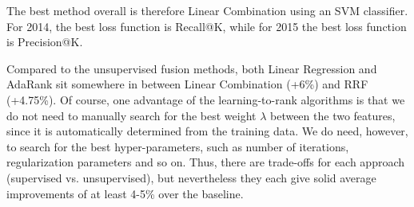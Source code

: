 \begin{table}[h!]
\centering
\caption{Comparison between the best fusion methods --- absolute P@10 percent improvements for each of the four query runs
(Summaries 2014, Descriptions 2014, Summaries 2015, Descriptions 2015).}
\label{fusion-comp}
\end{table}

The best method overall is therefore Linear Combination using an SVM classifier. For 2014, the best loss function
is Recall@K, while for 2015 the best loss function is Precision@K.

Compared to the unsupervised fusion methods, both Linear Regression and AdaRank sit somewhere in between
Linear Combination (+6\%) and RRF (+4.75\%). Of course, one advantage of the learning-to-rank algorithms
is that we do not need to manually search for the best weight $\lambda$ between the two features,
since it is automatically determined
from the training data.
We do need, however, to search for the best hyper-parameters, such as number of iterations, regularization
parameters and so on. Thus, there are trade-offs for each approach (supervised vs. unsupervised),
but nevertheless they each give solid average improvements of at least 4-5\% over the baseline.

